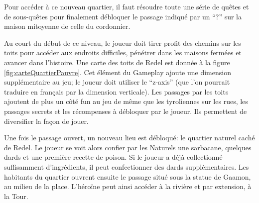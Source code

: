 Pour accéder à ce nouveau quartier, il faut résoudre toute une série de quêtes et de sous-quêtes pour finalement débloquer le passage indiqué par un \enquote{?} sur la maison mitoyenne de celle du cordonnier.

Au court du début de ce niveau, le joueur doit tirer profit des chemins sur les toits pour accéder aux endroits difficiles, pénétrer dans les maisons fermées et avancer dans l'histoire. Une carte des toits de Redel est donnée à la figure \ref{fig:carteQuartierPauvre}. Cet élément du Gameplay ajoute une dimension supplémentaire au jeu; le joueur doit utiliser le \enquote{z-axis} (que l'on pourrait traduire en français par la dimension verticale). Les passages par les toits ajoutent de plus un côté fun au jeu de même que les tyroliennes sur les rues, les passages secrets et les récompenses à débloquer par le joueur. Ils permettent de diversifier la façon de jouer.

Une fois le passage ouvert, un nouveau lieu est débloqué: le quartier naturel caché de Redel. Le joueur se voit alors confier par les Naturels une sarbacane, quelques dards et une première recette de poison. Si le joueur a déjà collectionné suffisamment d'ingrédients, il peut confectionner des dards supplémentaires. Les habitants du quartier ouvrent ensuite le passage situé sous la statue de Gaamon, au milieu de la place. L'héroïne peut ainsi accéder à la rivière et par extension, à la Tour.



